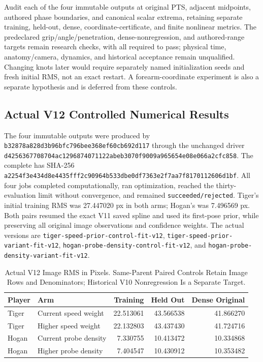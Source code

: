 \documentclass[11pt,letterpaper]{article}
\newcommand{\code}[1]{\nolinkurl{#1}}
\newcommand{\hash}[1]{{\footnotesize\nolinkurl{#1}}}
\begin{document}
Audit each of the four immutable outputs at original PTS, adjacent midpoints,
authored phase boundaries, and canonical scalar extrema, retaining separate
training, held-out, dense, coordinate-certificate, and finite nonlinear metrics.
The predeclared grip/angle/penetration, dense-nonregression, and authored-range
targets remain research checks, with all required to pass; physical time,
anatomy/\allowbreak camera, dynamics, and historical acceptance remain unqualified.
Changing knots later would require separately named initialization seeds and
fresh initial RMS, not an exact restart. A forearm-coordinate experiment is
also a separate hypothesis and is deferred from these controls.

\subsection{Actual V12 Controlled Numerical Results}
The four immutable outputs were produced by
\hash{b32878a828d3b96bfc796bee368ef60cb692d117} through the unchanged driver
\hash{d4256367708704ac1296874071122abeb3070f9009a965654e08e066a2cfc858}.
The complete 
has SHA-256
\hash{a2254f3e434d8e4435fff2c90964b533dbe0df7363e2f7aa7f8170112606d1bf}.
All four jobs completed computationally, ran optimization, reached the
thirty-evaluation limit without convergence, and remained
\code{succeeded/rejected}. Tiger's initial training RMS was 27.447020 px in
both arms; Hogan's was 7.496569 px. Both pairs resumed the exact V11 saved
spline and used its first-pose prior, while preserving all original image
observations and confidence weights. The actual versions are
\code{tiger-speed-prior-control-fit-v12},
\code{tiger-speed-prior-variant-fit-v12},
\code{hogan-probe-density-control-fit-v12}, and
\code{hogan-probe-density-variant-fit-v12}.

\begin{table}[ht]\centering\small
\begin{tabular}{@{}llrrr@{}}
\toprule Player & Arm & Training & Held Out & Dense Original\\\midrule
Tiger & Current speed weight & 22.513061 & 43.566538 & 41.866270\\
Tiger & Higher speed weight & 22.132803 & 43.437430 & 41.724716\\
Hogan & Current probe density & 7.330755 & 10.413472 & 10.334868\\
Hogan & Higher probe density & 7.404547 & 10.430912 & 10.353482\\
\bottomrule
\end{tabular}
\caption{Actual V12 Image RMS in Pixels. Same-Parent Paired Controls Retain
Image Rows and Denominators; Historical V10 Nonregression Is a Separate Target.}
\end{table}
\end{document}

